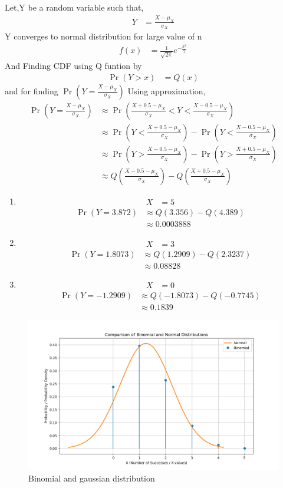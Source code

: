 \documentclass[journal,11pt,onecolumn]{IEEEtran}
\providecommand{\pr}[1]{\ensuremath{\Pr\left(#1\right)}}
\providecommand{\qfunc}[1]{\ensuremath{Q\left(#1\right)}}
\providecommand{\brak}[1]{\ensuremath{\left(#1\right)}}
\providecommand{\pr}[1]{\ensuremath{\Pr\left(#1\right)}}
\providecommand{\qfunc}[1]{\ensuremath{Q\left(#1\right)}}
\providecommand{\qfunc}[1]{\ensuremath{Q\left(#1\right)}}
\begin{document}
Let,Y be a random variable such that,
\begin{align}
	Y&=\frac{X- \mu_X}{\sigma_X}
\end{align}
Y converges to normal distribution for large value of n
\begin{align}
	f\brak{x}&=\frac{1}{\sqrt{2\pi}}e^{-\frac{x^2}{2}}
\end{align}
And Finding CDF using Q funtion by 
\begin{align}
	\pr{Y >x}&=\qfunc{x}
\end{align}
and for finding \pr{Y=\frac{X-\mu_X}{\sigma_X}} Using approximation,
\begin{align}
	\pr{Y=\frac{X-\mu_X}{\sigma_X}} &\approx \pr{\frac{X+0.5-\mu_X}{\sigma_X} < Y < \frac{X-0.5-\mu_X}{\sigma_X}}\\
	&\approx \pr{Y<\frac{X+0.5-\mu_X}{\sigma_X}} - \pr{Y<\frac{X-0.5-\mu_X}{\sigma_X}}\\
	&\approx \pr{Y>\frac{X-0.5-\mu_X}{\sigma_X}} - \pr{Y>\frac{X+0.5-\mu_X}{\sigma_X}}\\
	&\approx \qfunc{\frac{X-0.5-\mu_X}{\sigma_X}} - \qfunc{\frac{X+0.5-\mu_X}{\sigma_X}}
\end{align}
\begin{enumerate}
	\item 
	\begin{align}
		X&=5
	\end{align}
	\begin{align}
	\pr{Y=3.872}&\approx \qfunc{3.356} - \qfunc{4.389}\\
	&\approx 0.0003888
	\end{align}
	\item 
	\begin{align}
		X&=3
	\end{align}
	\begin{align}
	\pr{Y=1.8073}&\approx \qfunc{1.2909} - \qfunc{2.3237}\\
	&\approx 0.08828
	\end{align}
	\item 
	\begin{align}
		X&=0
	\end{align}
	\begin{align}
	\pr{Y=-1.2909}&\approx \qfunc{-1.8073} - \qfunc{-0.7745}\\
	&\approx 0.1839
	\end{align}
\end{enumerate}

\begin{figure}[ht!]
	\centering
	\includegraphics[width=\columnwidth]{figs/fig.png}
	\caption{Binomial and gaussian distribution}
	\label{fig:gauss9.3.3}
\end{figure}
\end{document}
